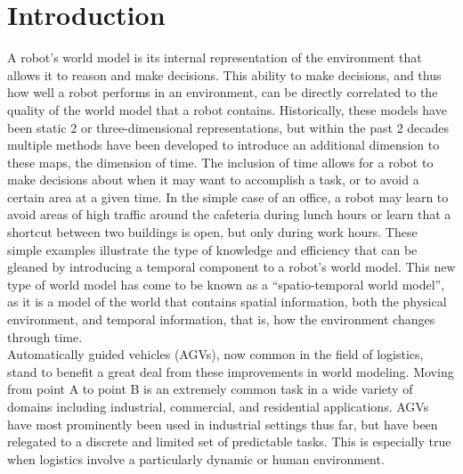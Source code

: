 

  \chapter{ Introduction }

  A robot's world model is its internal representation of the environment that
  allows it to reason and make decisions. This ability to make decisions, and
  thus how well a robot performs in an environment, can be directly correlated
  to the quality of the world model that a robot contains. Historically, these models
  have been static 2 or three-dimensional representations, but within the past
  2 decades multiple methods have been developed to introduce an additional
  dimension to these maps, the dimension of time. The inclusion of time allows
  for a robot to make decisions about when it may want to accomplish a task, or
  to avoid a certain area at a given time. In the simple case of an
  office, a robot may learn to avoid areas of high traffic around the cafeteria
  during lunch hours or learn that a shortcut between two buildings is open, but only
  during work hours. These simple examples illustrate the type of knowledge and
  efficiency that can be gleaned by introducing a temporal component to a robot's
  world model. This new type of world model has come to be known as a
  ``spatio-temporal world model'', as it is a model of the world that contains
  spatial information, both the physical environment, and temporal
  information, that is, how the environment changes through time.\\

  Automatically guided vehicles (AGVs), now common in the field of logistics,
  stand to benefit a great deal from these improvements in world modeling.
  Moving from point A to point B is an extremely common task in a wide
  variety of domains including industrial, commercial, and residential
  applications. AGVs have most prominently been used in industrial settings thus
  far, but have been relegated to a discrete and limited set
  of predictable tasks. This is especially true when logistics involve a
  particularly dynamic or human environment. \\

